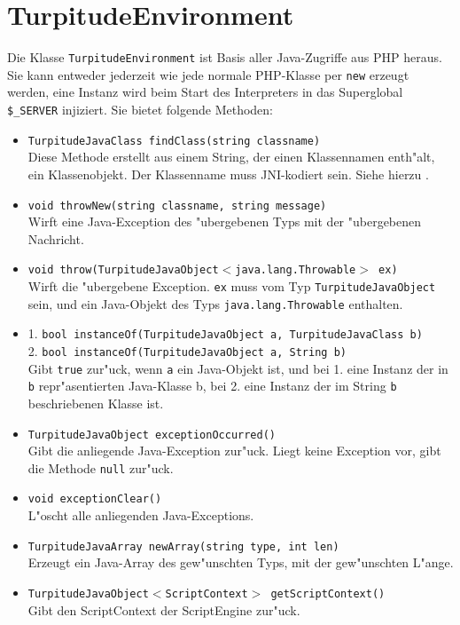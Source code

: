 
\section{TurpitudeEnvironment}

Die Klasse \texttt{TurpitudeEnvironment} ist Basis aller Java-Zugriffe aus PHP heraus.
Sie kann entweder jederzeit wie jede normale PHP-Klasse per \texttt{new} erzeugt werden,
eine Instanz wird beim Start des Interpreters in das Superglobal \texttt{\$\_SERVER}
injiziert. Sie bietet folgende Methoden:

\begin{itemize}
\item
\texttt{TurpitudeJavaClass findClass(string classname)}\\
Diese Methode erstellt aus einem String, der einen Klassennamen enth"alt, ein
Klassenobjekt. Der Klassenname muss JNI-kodiert sein. Siehe hierzu \cite{JNIHP}.
\item
\texttt{void throwNew(string classname, string message)}\\
Wirft eine Java-Exception des "ubergebenen Typs mit der "ubergebenen Nachricht.
\item
\texttt{void throw(TurpitudeJavaObject$<$java.lang.Throwable$>$ ex)}\\
Wirft die "ubergebene Exception. \texttt{ex} muss vom Typ \texttt{TurpitudeJavaObject}
sein, und ein Java-Objekt des Typs \texttt{java.lang.Throwable} enthalten.
\item
1. \texttt{bool instanceOf(TurpitudeJavaObject a, TurpitudeJavaClass b)}\\
2. \texttt{bool instanceOf(TurpitudeJavaObject a, String b)}\\
Gibt \texttt{true} zur"uck, wenn \texttt{a} ein Java-Objekt ist, und bei 1. eine Instanz
der in \texttt{b} repr"asentierten Java-Klasse b, bei 2. eine Instanz der im String \texttt{b} 
beschriebenen Klasse ist.
\item
\texttt{TurpitudeJavaObject exceptionOccurred()}\\
Gibt die anliegende Java-Exception zur"uck. Liegt keine Exception vor, gibt die Methode
\texttt{null} zur"uck.
\item
\texttt{void exceptionClear()}\\
L"oscht alle anliegenden Java-Exceptions.
\item
\texttt{TurpitudeJavaArray newArray(string type, int len)}\\
Erzeugt ein Java-Array des gew"unschten Typs, mit der gew"unschten L"ange.
\item
\texttt{TurpitudeJavaObject$<$ScriptContext$>$ getScriptContext()}\\
Gibt den ScriptContext der ScriptEngine zur"uck.
\end{itemize}
